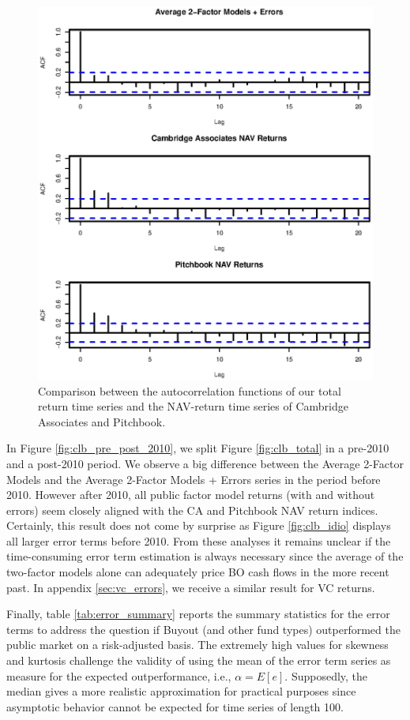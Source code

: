 \documentclass[12pt]{article}
\begin{document}
\begin{figure}[H]
	\centering
	\includegraphics{Figures/ACFunBO}
	\caption{
		Comparison between the autocorrelation functions of our total return time series and the NAV-return time series of Cambridge Associates and Pitchbook.
	}
	\label{fig:autocorrelation}
\end{figure}

In Figure \ref{fig:clb_pre_post_2010}, we split Figure \ref{fig:clb_total} in a pre-2010 and a post-2010 period.
We observe a big difference between the Average 2-Factor Models and the Average 2-Factor Models + Errors series in the period before 2010.
However after 2010, all public factor model returns (with and without errors) seem closely aligned with the CA and Pitchbook NAV return indices.
Certainly, this result does not come by surprise as Figure \ref{fig:clb_idio} displays all larger error terms before 2010.
From these analyses it remains unclear if the time-consuming error term estimation is always necessary since the average of the two-factor models alone can adequately price BO cash flows in the more recent past.
In appendix \ref{sec:vc_errors}, we receive a similar result for VC returns.

Finally, table \ref{tab:error_summary} reports the summary statistics for the error terms to address the question if Buyout (and other fund types) outperformed the public market on a risk-adjusted basis.
The extremely high values for skewness and kurtosis challenge the validity of using the mean of the error term series as measure for the expected outperformance, i.e., $\alpha = E [ e ]$.
Supposedly, the median gives a more realistic approximation for practical purposes since asymptotic behavior cannot be expected for time series of length 100.
\end{document}
